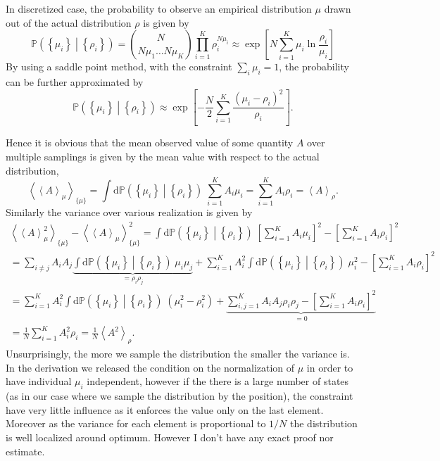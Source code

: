 \documentclass[11pt]{article}
\newcommand{\rmd}{{\mathrm d}}
\begin{document}
In discretized case, the probability to observe an empirical distribution $\mu$ drawn out of the actual distribution $\rho$ is given by 
\[
{\mathbb P}\left( \left\{ \mu_i \right\} \middle| \left\{ \rho_i \right\} \right) 
= \binom{N}{ N \mu_1 \ldots N \mu_K } \prod\limits_{i=1}^K \rho_i^{N \mu_i} 
\approx \exp \left[ N \sum\limits_{i=1}^K \mu_i \ln \frac{\rho_i}{\mu_i} \right] 
\]
By using a saddle point method, with the constraint $\sum_i \mu_i = 1$, the probability can be further approximated by 
\[
{\mathbb P}\left( \left\{ \mu_i \right\} \middle| \left\{ \rho_i \right\} \right) 
\approx \exp \left[ - \frac{N}{2} \sum\limits_{i=1}^K \frac{ \left( \mu_i - \rho_i \right)^2 }{ \rho_i } \right] .
\]

Hence it is obvious that the mean observed value of some quantity $A$ over multiple samplings is given by the mean value with respect to the actual distribution, 
\[
\left\langle \left\langle A \right\rangle_\mu \right\rangle_{\{\mu\}} 
= \int \rmd {\mathbb P}\left( \left\{ \mu_i \right\} \middle| \left\{ \rho_i \right\} \right) \; \sum_{i=1}^K A_i \mu_i 
= \sum_{i=1}^K A_i \rho_i 
= \left\langle A \right\rangle_\rho .
\]
Similarly the variance over various realization is given by 
\begin{multline*}
\left\langle \left\langle A \right\rangle_\mu^2 \right\rangle_{\{\mu\}} - \left\langle \left\langle A \right\rangle_\mu \right\rangle_{\{\mu\}}^2  
= \int \rmd {\mathbb P}\left( \left\{ \mu_i \right\} \middle| \left\{ \rho_i \right\} \right) \; \left[ \sum_{i=1}^K A_i \mu_i \right]^2 
- \left[ \sum_{i=1}^K A_i \rho_i \right]^2 \\  
= \sum_{i \neq j} A_i A_j \underbrace{ \int \rmd {\mathbb P}\left( \left\{ \mu_i \right\} \middle| \left\{ \rho_i \right\} \right) \; \mu_i \mu_j }_{ = \rho_i \rho_j }  
+ \sum_{i=1}^K A_i^2 \int \rmd {\mathbb P}\left( \left\{ \mu_i \right\} \middle| \left\{ \rho_i \right\} \right) \; \mu_i^2  
- \left[ \sum_{i=1}^K A_i \rho_i \right]^2 \\ 
= \sum_{i=1}^K A_i^2 \int \rmd {\mathbb P}\left( \left\{ \mu_i \right\} \middle| \left\{ \rho_i \right\} \right) \; \left( \mu_i^2 - \rho_i^2 \right)
+ \underbrace{ \sum_{i, j = 1 }^K A_i A_j \rho_i \rho_j 
- \left[ \sum_{i=1}^K A_i \rho_i \right]^2 }_{ = 0 } \\  
= \frac{1}{N} \sum_{i=1}^K A_i^2 \rho_i 
= \frac{1}{N} \left\langle A^2 \right\rangle_\rho . 
\end{multline*}
Unsurprisingly, the more we sample the distribution the smaller the variance is. 
In the derivation we released the condition on the normalization of $\mu$ in order to have individual $\mu_i$ independent, 
however if the there is a large number of states (as in our case where we sample the distribution by the position), 
the constraint have very little influence as it enforces the value only on the last element. 
Moreover as the variance for each element is proportional to $1/N$ the distribution is well localized around optimum. 
However I don't have any exact proof nor estimate.
\end{document}
